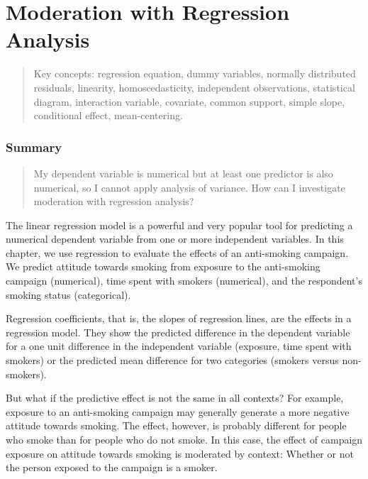 \documentclass[a4paper]{book}
\theoremstyle{definition}
\theoremstyle{definition}
\theoremstyle{definition}
\theoremstyle{remark}
\begin{document}
\chapter{Moderation with Regression Analysis}\label{moderation}

\begin{quote}
Key concepts: regression equation, dummy variables, normally distributed
residuals, linearity, homoscedasticity, independent observations,
statistical diagram, interaction variable, covariate, common support,
simple slope, conditional effect, mean-centering.
\end{quote}

\subsection*{Summary}\label{summary-7}

\begin{quote}
My dependent variable is numerical but at least one predictor is also
numerical, so I cannot apply analysis of variance. How can I investigate
moderation with regression analysis?
\end{quote}

The linear regression model is a powerful and very popular tool for
predicting a numerical dependent variable from one or more independent
variables. In this chapter, we use regression to evaluate the effects of
an anti-smoking campaign. We predict attitude towards smoking from
exposure to the anti-smoking campaign (numerical), time spent with
smokers (numerical), and the respondent's smoking status (categorical).

Regression coefficients, that is, the slopes of regression lines, are
the effects in a regression model. They show the predicted difference in
the dependent variable for a one unit difference in the independent
variable (exposure, time spent with smokers) or the predicted mean
difference for two categories (smokers versus non-smokers).

But what if the predictive effect is not the same in all contexts? For
example, exposure to an anti-smoking campaign may generally generate a
more negative attitude towards smoking. The effect, however, is probably
different for people who smoke than for people who do not smoke. In this
case, the effect of campaign exposure on attitude towards smoking is
moderated by context: Whether or not the person exposed to the campaign
is a smoker.
\end{document}
